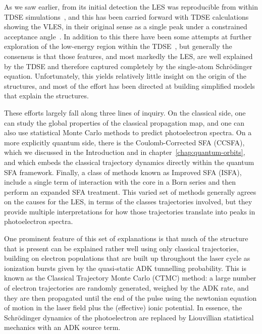 As we saw earlier, from its initial detection the LES was reproducible from within TDSE simulations~\cite{blaga_original_LES,catoire_angular-distributions_2009}, and this has been carried forward with TDSE calculations showing the VLES, in their original sense as a single peak under a constrained acceptance angle~\cite{VLES_characterization}. In addition to this there have been some attempts at further exploration of the low-energy region within the TDSE~\cite{telnov_TDSE_with_and_without_Coulomb, lemell_classicalquantum_2013}, but generally the consensus is that those features, and most markedly the LES, are well explained by the TDSE and therefore captured completely by the single-atom Schrödinger equation. Unfortunately, this yields relatively little insight on the origin of the structures, and most of the effort has been directed at building simplified models that explain the structures.



These efforts largely fall along three lines of inquiry. On the classical side, one can study the global properties of the classical propagation map, and one can also use statistical Monte Carlo methods to predict photoelectron spectra. On a more explicitly quantum side, there is the Coulomb-Corrected SFA (CCSFA), which we discussed in the Introduction and in chapter~\ref{chap:quantum-orbits}, and which embeds the classical trajectory dynamics directly within the quantum SFA framework. Finally, a class of methods known as Improved SFA (ISFA), include a single term of interaction with the core in a Born series and then perform an expanded SFA treatment. This varied set of methods generally agrees on the causes for the LES, in terms of the classes trajectories involved, but they provide multiple interpretations for how those trajectories translate into peaks in photoelectron spectra.	



One prominent feature of this set of explanations is that much of the structure that is present can be explained rather well using only classical trajectories, building on electron populations that are built up throughout the laser cycle as ionization bursts given by the quasi-static ADK tunnelling probability. This is known as the Classical Trajectory Monte Carlo (CTMC) method: a large number of electron trajectories are randomly generated, weighed by the ADK rate, and they are then propagated until the end of the pulse using the newtonian equation of motion in the laser field plus the (effective) ionic potential. In essence, the Schrödinger dynamics of the photoelectron are replaced by Liouvillian statistical mechanics with an ADK source term.

